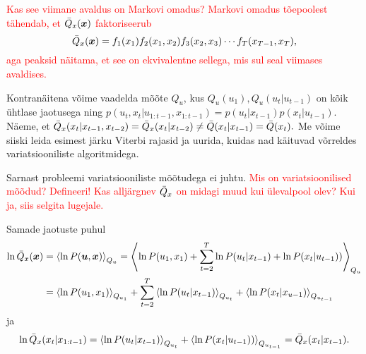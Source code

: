 \textcolor{red}{Kas see viimane avaldus on Markovi omadus? Markovi omadus tõepoolest tähendab, et  $\Bar{Q}_x(\bm{x})$ faktoriseerub
$$\Bar{Q}_x(\bm{x})=f_1(x_1)f_2(x_1,x_2)f_3(x_2,x_3)\cdots f_T(x_{T-1},x_T),$$
aga peaksid näitama, et see on ekvivalentne sellega, mis sul seal viimases avaldises.}

Kontranäitena võime vaadelda mõõte $Q_u$, kus $Q_u(u_1), Q_u(u_t|u_{t-1})$ on kõik ühtlase jaotusega ning $p(u_t,x_t|u_{1:t-1},x_{1:t-1}) = p(u_t|x_{t-1})p(x_t|u_{t-1})$. Näeme, et
$\Bar{Q}_x(x_t|x_{t-1},x_{t-2}) = \Bar{Q}_x(x_t|x_{t-2}) \ne \Bar{Q}(x_t|x_{t-1}) = \Bar{Q}(x_t).$
Me võime siiski leida esimest järku Viterbi rajasid ja uurida, kuidas nad käituvad võrreldes variatsiooniliste algoritmidega. \bla

Sarnast probleemi variatsiooniliste mõõtudega ei juhtu. \textcolor{red}{Mis on variatsioonilised mõõdud? Defineeri! Kas alljärgnev 
$\Bar{Q}_x$ on midagi muud kui ülevalpool olev? Kui ja, siis selgita lugejale.}

Samade jaotuste puhul
\begin{align*}
\ln \Bar{Q}_x(\bm{x}) &= \left<\ln P(\bm{u},\bm{x})\right>_{Q_u} = \left<\ln P(u_1,x_1) + \sum_{t=2}^T \ln P(u_t | x_{t-1}) + \ln P(x_t | u_{t-1}))\right>_{Q_u} \\
&= \left< \ln P(u_1,x_1) \right>_{Q_{u_1}} + \sum_{t=2}^T \left< \ln P(u_t|x_{t-1}) \right>_{Q_{u_t}} + \left< \ln P(x_t|x_{u-1}) \right>_{Q_{u_{t-1}}}
\end{align*}
ja
$$\ln \Bar{Q}_x(x_t|x_{1:t-1}) = \left< \ln P(u_t | x_{t-1}) \right>_{Q_{u_t}} + \left< \ln P(x_t | u_{t-1}))\right>_{Q_{u_{t-1}}} = \Bar{Q}_x(x_t|x_{t-1}).$$